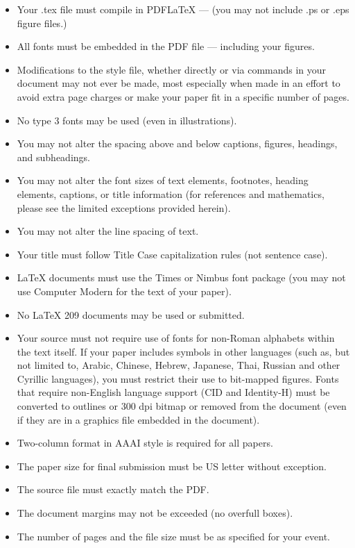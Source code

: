 \documentclass[letterpaper]{article} %
\begin{document}
\begin{itemize}
\item Your .tex file must compile in PDF\LaTeX{} --- (you may not include .ps or .eps figure files.)
\item All fonts must be embedded in the PDF file --- including your figures.
\item Modifications to the style file, whether directly or via commands in your document may not ever be made, most especially when made in an effort to avoid extra page charges or make your paper fit in a specific number of pages.
\item No type 3 fonts may be used (even in illustrations).
\item You may not alter the spacing above and below captions, figures, headings, and subheadings.
\item You may not alter the font sizes of text elements, footnotes, heading elements, captions, or title information (for references and mathematics, please see the limited exceptions provided herein).
\item You may not alter the line spacing of text.
\item Your title must follow Title Case capitalization rules (not sentence case).
\item \LaTeX{} documents must use the Times or Nimbus font package (you may not use Computer Modern for the text of your paper).
\item No \LaTeX{} 209 documents may be used or submitted.
\item Your source must not require use of fonts for non-Roman alphabets within the text itself. If your paper includes symbols in other languages (such as, but not limited to, Arabic, Chinese, Hebrew, Japanese, Thai, Russian and other Cyrillic languages), you must restrict their use to bit-mapped figures. Fonts that require non-English language support (CID and Identity-H) must be converted to outlines or 300 dpi bitmap or removed from the document (even if they are in a graphics file embedded in the document).
\item Two-column format in AAAI style is required for all papers.
\item The paper size for final submission must be US letter without exception.
\item The source file must exactly match the PDF.
\item The document margins may not be exceeded (no overfull boxes).
\item The number of pages and the file size must be as specified for your event.

\end{itemize}
\end{document}
